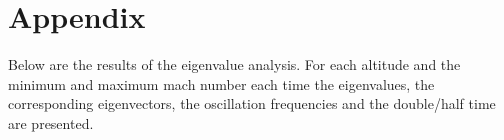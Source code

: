\section{Appendix}
Below are the results of the eigenvalue analysis. For each altitude and the 
minimum and maximum mach  number each time the eigenvalues, the corresponding
eigenvectors, the oscillation frequencies and the double/half time are
presented.


